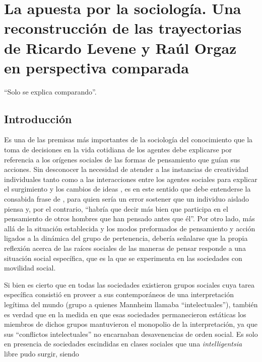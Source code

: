 \mainmatter

\chapter[La apuesta por la sociología. Una reconstrucción de las trayectorias de Ricardo Levene y Raúl Orgaz en perspectiva comparada]{La apuesta por la sociología. Una reconstrucción de las trayectorias de Ricardo Levene y Raúl Orgaz en perspectiva comparada}

\epigraph{\enquote{Solo se explica comparando}.}{\textcite{1617-DURKHEIM2006}}

\section{Introducción}

Es una de las premisas más importantes de la sociología del conocimiento que la toma de decisiones en la vida cotidiana de los agentes debe explicarse por referencia a los orígenes sociales de las formas de pensamiento que guían sus acciones. Sin desconocer la necesidad de atender a las instancias de creatividad individuales tanto como a las interacciones entre los agentes sociales para explicar el surgimiento y los cambios de ideas \parencite{1527-SALES2007}, es en este sentido que debe entenderse la consabida frase de \textcite[3]{1707-MANNHEIM1986}, para quien sería un error sostener que un individuo aislado piensa y, por el contrario, \enquote{habría que decir más bien que participa en el pensamiento de otros hombres que han pensado antes que él}. Por otro lado, más allá de la situación establecida y los modos preformados de pensamiento y acción ligados a la dinámica del grupo de pertenencia, debería señalarse que la propia reflexión acerca de las raíces sociales de las maneras de pensar responde a una situación social específica, que es la que se experimenta en las sociedades con movilidad social.

Si bien es cierto que en todas las sociedades existieron grupos sociales cuya tarea específica consistió en proveer a sus contemporáneos de una interpretación legítima del mundo (grupo a quienes Mannheim llamaba \enquote{intelectuales}), también es verdad que en la medida en que esas sociedades permanecieron estáticas los miembros de dichos grupos mantuvieron el monopolio de la interpretación, ya que sus \enquote{conflictos intelectuales} no encarnaban desavenencias de orden social. Es solo en presencia de sociedades escindidas en clases sociales que una \emph{intelligentsia} libre pudo surgir, siendo

